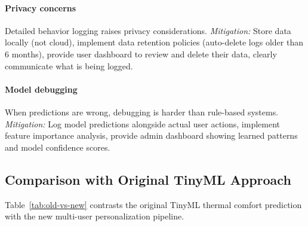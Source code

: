 \paragraph{Privacy concerns}
Detailed behavior logging raises privacy considerations. \emph{Mitigation:}
Store data locally (not cloud), implement data retention policies
(auto-delete logs older than 6 months), provide user dashboard to review
and delete their data, clearly communicate what is being logged.

\paragraph{Model debugging}
When predictions are wrong, debugging is harder than rule-based systems.
\emph{Mitigation:} Log model predictions alongside actual user actions,
implement feature importance analysis, provide admin dashboard showing
learned patterns and model confidence scores.

\subsection{Comparison with Original TinyML Approach}

Table~\ref{tab:old-vs-new} contrasts the original TinyML thermal comfort
prediction with the new multi-user personalization pipeline.

